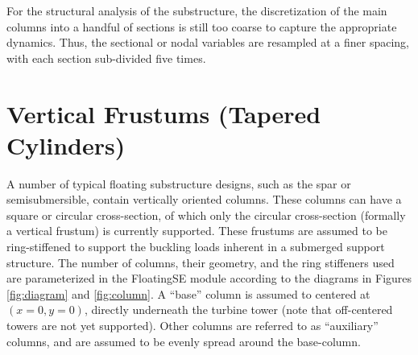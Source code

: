 For the structural analysis of the substructure, the
discretization of the main columns into a handful of sections is still too
coarse to capture the appropriate dynamics.  Thus, the sectional or
nodal variables are resampled at a finer spacing, with each section
sub-divided five times.

\section{Vertical Frustums (Tapered Cylinders)}
A number of typical floating substructure designs, such as the spar or
semisubmersible, contain vertically oriented columns.  These columns can
have a square or circular cross-section, of which only the circular
cross-section (formally a vertical frustum) is currently supported.
These frustums are assumed to be ring-stiffened to support the buckling
loads inherent in a submerged support structure.  The number of columns,
their geometry, and the ring stiffeners used are parameterized in the
FloatingSE module according to the diagrams in Figures \ref{fig:diagram}
and \ref{fig:column}.  A ``base'' column is
assumed to centered at $(x=0, y=0)$, directly underneath the turbine
tower (note that off-centered towers are not yet supported).  Other
columns are referred to as ``auxiliary'' columns, and are assumed to be
evenly spread around the base-column.
